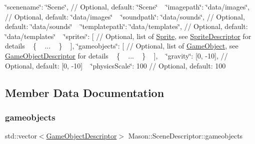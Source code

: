 \char`\"{}scenename\char`\"{}\+: \char`\"{}\+Scene\char`\"{}, // Optional, default\+: \char`\"{}\+Scene\char`\"{} ~\newline
 \char`\"{}imagepath\char`\"{}\+: \char`\"{}data/images\char`\"{}, // Optional, default\+: \char`\"{}data/images\char`\"{} ~\newline
 \char`\"{}soundpath\char`\"{}\+: \char`\"{}data/sounds\char`\"{}, // Optional, default\+: \char`\"{}data/sounds\char`\"{} ~\newline
 \char`\"{}templatepath\char`\"{}\+: \char`\"{}data/templates\char`\"{}, // Optional, default\+: \char`\"{}data/templates\char`\"{} ~\newline
 \char`\"{}sprites\char`\"{}\+: \mbox{[} // Optional, list of \hyperlink{class_mason_1_1_sprite}{Sprite}, see \hyperlink{class_mason_1_1_sprite_descriptor}{Sprite\+Descriptor} for details ~\newline
 \{ ~\newline
 ... ~\newline
 \} ~\newline
 \mbox{]}, \char`\"{}gameobjects\char`\"{}\+: \mbox{[} // Optional, list of \hyperlink{class_mason_1_1_game_object}{Game\+Object}, see \hyperlink{class_mason_1_1_game_object_descriptor}{Game\+Object\+Descriptor} for details ~\newline
 \{ ~\newline
 ... ~\newline
 \} ~\newline
 \mbox{]}, ~\newline
 \char`\"{}gravity\char`\"{}\+: \mbox{[}0, -\/10\mbox{]}, // Optional, default\+: \mbox{[}0, -\/10\mbox{]} ~\newline
 \char`\"{}physics\+Scale\char`\"{}\+: 100 // Optional, default\+: 100 ~\newline
 

\subsection{Member Data Documentation}
\hypertarget{class_mason_1_1_scene_descriptor_a1883e270cf9361e9797269cc0bed1bbc}{}\label{class_mason_1_1_scene_descriptor_a1883e270cf9361e9797269cc0bed1bbc} 
\subsubsection{\texorpdfstring{gameobjects}{gameobjects}}
{\footnotesize\ttfamily std\+::vector$<$\hyperlink{class_mason_1_1_game_object_descriptor}{Game\+Object\+Descriptor}$>$ Mason\+::\+Scene\+Descriptor\+::gameobjects}

